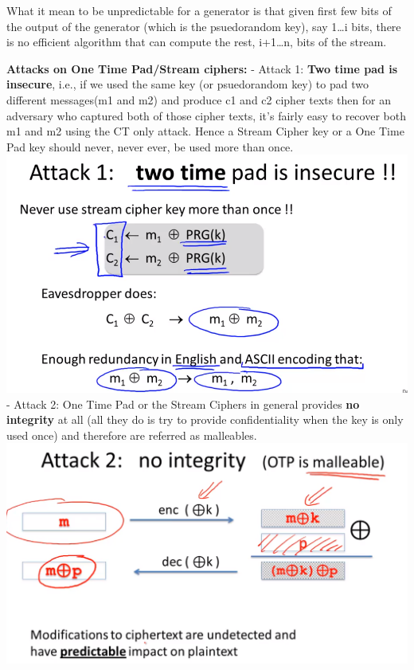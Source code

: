 \documentclass[11pt]{article}
\makeatletter
\def\maxwidth{\ifdim\Gin@nat@width>\linewidth\linewidth
    \else\Gin@nat@width\fi}
\let\Oldincludegraphics\includegraphics
\renewcommand{\includegraphics}[1]{\Oldincludegraphics[width=.8\maxwidth]{#1}}
\makeatother
\begin{document}
What it mean to be unpredictable for a generator is that given first few
bits of the output of the generator (which is the psuedorandom key), say
1\ldots{}i bits, there is no efficient algorithm that can compute the
rest, i+1\ldots{}n, bits of the stream.

\textbf{Attacks on One Time Pad/Stream ciphers:} - Attack 1: \textbf{Two
time pad is insecure}, i.e., if we used the same key (or psuedorandom
key) to pad two different messages(m1 and m2) and produce c1 and c2
cipher texts then for an adversary who captured both of those cipher
texts, it's fairly easy to recover both m1 and m2 using the CT only
attack. Hence a Stream Cipher key or a One Time Pad key should never,
never ever, be used more than once.
\includegraphics{./Images/TwoTimePad.png} - Attack 2: One Time Pad or
the Stream Ciphers in general provides \textbf{no integrity} at all (all
they do is try to provide confidentiality when the key is only used
once) and therefore are referred as malleables.
\includegraphics{./Images/MalleableOTP.png}
\end{document}
